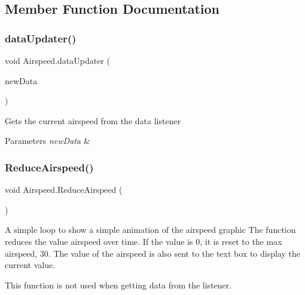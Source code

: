\subsection{Member Function Documentation}
\mbox{\label{class_airspeed_a19e789a2ca2668e1be21d2f3d7ca0b4a}} 
\subsubsection{\texorpdfstring{data\+Updater()}{dataUpdater()}}
{\footnotesize\ttfamily void Airspeed.\+data\+Updater (\begin{DoxyParamCaption}\item[{\hyperlink{class_data_struct}{Data\+Struct}}]{new\+Data }\end{DoxyParamCaption})}



Gets the current airspeed from the data listener 


\begin{DoxyParams}{Parameters}
{\em new\+Data} & \\
\hline
\end{DoxyParams}
\mbox{\label{class_airspeed_a865cbdbf55eeee710e499959cdade3e8}} 
\subsubsection{\texorpdfstring{Reduce\+Airspeed()}{ReduceAirspeed()}}
{\footnotesize\ttfamily void Airspeed.\+Reduce\+Airspeed (\begin{DoxyParamCaption}{ }\end{DoxyParamCaption})}



A simple loop to show a simple animation of the airspeed graphic The function reduces the value airspeed over time. If the value is 0, it is reset to the max airspeed, 30. The value of the airspeed is also sent to the text box to display the current value. 

This function is not used when getting data from the listener. \mbox{\label{class_airspeed_aaa534aa23041db361ee0fa4505a3a25f}} 
